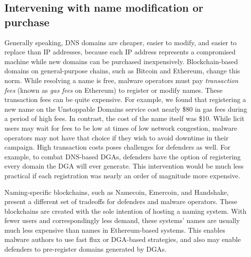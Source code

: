 \subsection{Intervening with name modification or purchase}

Generally speaking, DNS domains are cheaper, easier to modify, and 
easier to replace than IP addresses, because each IP address 
represents a compromised machine while new domains can be 
purchased inexpensively. Blockchain-based domains on 
general-purpose chains, such as Bitcoin and Ethereum, 
change this norm. While resolving a name is free, malware 
operators must pay \emph{transaction fees} 
(known as \emph{gas fees} on Ethereum)
to register or modify names. These transaction fees 
can be quite expensive. For example, we found that 
registering a new name on the Unstoppable Domains service 
cost nearly \$80 in gas fees during a period of high fees. 
In contrast, the cost of the name itself was \$10. While 
licit users may wait for fees to be low at times of low 
network congestion, malware operators may not have that 
choice if they wish to avoid downtime in their campaign. High 
transaction costs poses challenges for defenders as well. For 
example, to combat DNS-based DGAs, defenders have the option 
of registering every domain the DGA will ever generate. This 
intervention would be much less practical if each 
registration was nearly an order of magnitude more expensive.

Naming-specific blockchains, such as Namecoin, Emercoin, and Handshake, 
present a different set of tradeoffs for defenders and malware 
operators. These 
blockchains are created with the sole intention of hosting a naming system. 
With fewer users and correspondingly less demand, these systems' names are 
usually much less expensive than names in Ethereum-based systems. This enables 
malware authors to use fast flux or DGA-based strategies, and also may enable 
defenders to pre-register domains generated by DGAs. 






%
%
%
%
%
%
%

